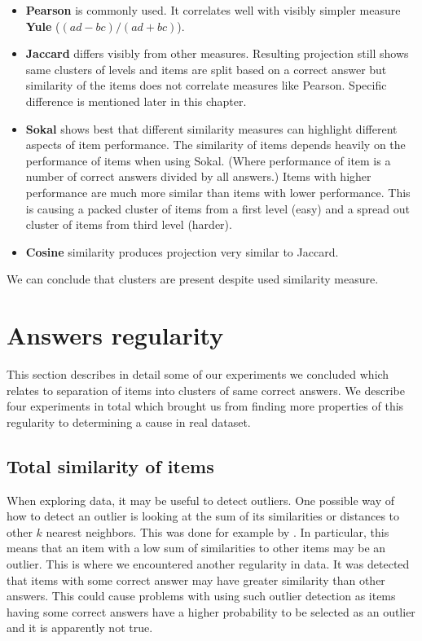 \documentclass[
  digital, %
  table,   %
  nolof,     %
  nolot,     %
  nocover,
  color,
  final, %
]{fithesis3}
\begin{document}
\begin{itemize}
\item
  \textbf{Pearson} is commonly used. It correlates well with visibly simpler measure \textbf{Yule} ($(ad-bc)/(ad+bc)$).

\item
  \textbf{Jaccard} differs visibly from other measures. Resulting projection still shows same clusters of levels and items are split based on a correct answer but similarity of the items does not correlate measures like Pearson. Specific difference is mentioned later in this chapter.

\item
  \textbf{Sokal} shows best that different similarity measures can highlight different aspects of item performance. The similarity of items depends heavily on the performance of items when using Sokal. (Where performance of item is a number of correct answers divided by all answers.) Items with higher performance are much more similar than items with lower performance. This is causing a packed cluster of items from a first level (easy) and a spread out cluster of items from third level (harder).

\item
  \textbf{Cosine} similarity produces projection very similar to Jaccard.
\end{itemize}

We can conclude that clusters are present despite used similarity measure.


\section{Answers regularity}\label{evaulation-answers-regularity}

This section describes in detail some of our experiments we concluded which relates to separation of items into clusters of same correct answers. We describe four experiments in total which brought us from finding more properties of this regularity to determining a cause in real dataset.


\subsection{Total similarity of items}\label{total-similarity-of-items}

When exploring data, it may be useful to detect outliers. One possible way of how to detect an outlier is looking at the sum of its similarities or distances to other $k$ nearest neighbors. This was done for example by \citeauthor{mitchell2014survey}\cite{mitchell2014survey}. In particular, this means that an item with a low sum of similarities to other items may be an outlier. This is where we encountered another regularity in data. It was detected that items with some correct answer may have greater similarity than other answers. This could cause problems with using such outlier detection as items having some correct answers have a higher probability to be selected as an outlier and it is apparently not true.
\end{document}
